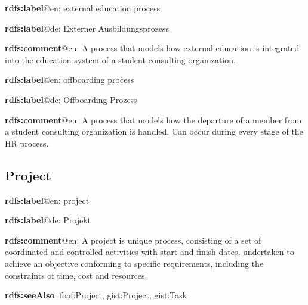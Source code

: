 \documentclass[a4paper, DIV=13, BCOR=0cm]{scrbook}
\begin{document}
\begin{mdframed}[style=onto-4, frametitle={External\_Education\_Process}]
	{%
		\begin{compactitem}
			\item \textbf{rdfs:label}@en: external education process
			\item \textbf{rdfs:label}@de: Externer Ausbildungsprozess
			\item \textbf{rdfs:comment}@en: A process that models how external education is integrated into the education system of a student consulting organization.
		\end{compactitem}
	} %
\end{mdframed}

\begin{mdframed}[style=onto-2, frametitle={Offboarding\_Process}]
	{%
		\begin{compactitem}
			\item \textbf{rdfs:label}@en: offboarding process
			\item \textbf{rdfs:label}@de: Offboarding-Prozess
			\item \textbf{rdfs:comment}@en: A process that models how the departure of a member from a student consulting organization is handled. Can occur during every stage of the HR process.
		\end{compactitem}
	} %
\end{mdframed}

\subsection{Project}
\begin{mdframed}[style=onto, frametitle={Project}]
	{%
		\begin{compactitem}
			\item \textbf{rdfs:label}@en: project
			\item \textbf{rdfs:label}@de: Projekt
			\item \textbf{rdfs:comment}@en: A project is unique process, consisting of a set of coordinated and controlled activities with start and finish dates, undertaken to achieve an objective conforming to specific requirements, including the constraints of time, cost and resources. \cite{iso-9000-2015}
			\item \textbf{rdfs:seeAlso}: foaf:Project, gist:Project, gist:Task
		\end{compactitem}
	} %
\end{mdframed}
\end{document}

